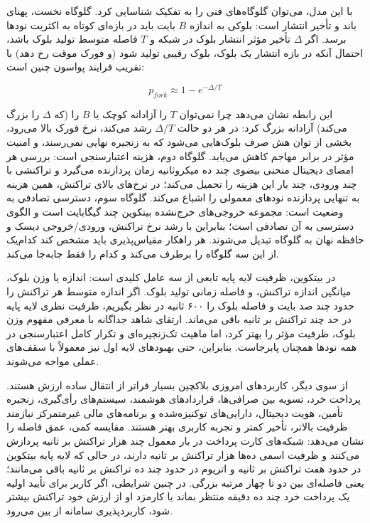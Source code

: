 با این مدل، می‌توان گلوگاه‌های فنی را به تفکیک شناسایی کرد. گلوگاه نخست، پهنای باند و تأخیر انتشار است: بلوکی به اندازه \(B\) بایت باید در بازه‌ای کوتاه به اکثریت نودها برسد. اگر \(\Delta\) تأخیر مؤثر انتشار بلوک در شبکه و \(T\) فاصله متوسط تولید بلوک باشد، احتمال آنکه در بازه انتشار یک بلوک، بلوک رقیبی تولید شود (و فورک موقت رخ دهد) با تقریب فرایند پواسون چنین است:

\begin{latin}
\[
p_{fork} \approx 1 - e^{-\Delta / T}
\]
\end{latin}

این رابطه نشان می‌دهد چرا نمی‌توان \(T\) را آزادانه کوچک یا \(B\) را (که \(\Delta\) را بزرگ می‌کند) آزادانه بزرگ کرد: در هر دو حالت \(\Delta/T\) رشد می‌کند، نرخ فورک بالا می‌رود، بخشی از توان هش صرف بلوک‌هایی می‌شود که به زنجیره نهایی نمی‌رسند، و امنیت مؤثر در برابر مهاجم کاهش می‌یابد. گلوگاه دوم، هزینه اعتبارسنجی است: بررسی هر امضای دیجیتال منحنی بیضوی چند ده میکروثانیه زمان پردازنده می‌گیرد و تراکنشی با چند ورودی، چند بار این هزینه را تحمیل می‌کند؛ در نرخ‌های بالای تراکنش، همین هزینه به تنهایی پردازنده نودهای معمولی را اشباع می‌کند. گلوگاه سوم، دسترسی تصادفی به وضعیت است: مجموعه خروجی‌های خرج‌نشده بیتکوین چند گیگابایت است و الگوی دسترسی به آن تصادفی است؛ بنابراین با رشد نرخ تراکنش، ورودی/خروجی دیسک و حافظه نهان به گلوگاه تبدیل می‌شوند. هر راهکار مقیاس‌پذیری باید مشخص کند کدام‌یک از این سه گلوگاه را برطرف می‌کند و کدام را فقط جابه‌جا می‌کند.

در بیتکوین، ظرفیت لایه پایه تابعی از سه عامل کلیدی است: اندازه یا وزن بلوک، میانگین اندازه تراکنش، و فاصله زمانی تولید بلوک. اگر اندازه متوسط هر تراکنش را حدود چند صد بایت و فاصله بلوک را ۶۰۰ ثانیه در نظر بگیریم، ظرفیت نظری لایه پایه در حد چند تراکنش بر ثانیه باقی می‌ماند. ارتقای شاهد جداگانه با معرفی مفهوم وزن بلوک، ظرفیت مؤثر را بهتر کرد، اما ماهیت تک‌زنجیره‌ای و تکرار کامل اعتبارسنجی در همه نودها همچنان پابرجاست. بنابراین، حتی بهبودهای لایه اول نیز معمولاً با سقف‌های عملی مواجه می‌شوند.

از سوی دیگر، کاربردهای امروزی بلاکچین بسیار فراتر از انتقال ساده ارزش هستند. پرداخت خرد، تسویه بین صرافی‌ها، قراردادهای هوشمند، سیستم‌های رأی‌گیری، زنجیره تأمین، هویت دیجیتال، دارایی‌های توکنیزه‌شده و برنامه‌های مالی غیرمتمرکز نیازمند ظرفیت بالاتر، تأخیر کمتر و تجربه کاربری بهتر هستند. مقایسه کمی، عمق فاصله را نشان می‌دهد: شبکه‌های کارت پرداخت در بار معمول چند هزار تراکنش بر ثانیه پردازش می‌کنند و ظرفیت اسمی ده‌ها هزار تراکنش بر ثانیه دارند، در حالی که لایه پایه بیتکوین در حدود هفت تراکنش بر ثانیه و اتریوم در حدود چند ده تراکنش بر ثانیه باقی می‌مانند؛ یعنی فاصله‌ای بین دو تا چهار مرتبه بزرگی. در چنین شرایطی، اگر کاربر برای تأیید اولیه یک پرداخت خرد چند ده دقیقه منتظر بماند یا کارمزد او از ارزش خود تراکنش بیشتر شود، کاربردپذیری سامانه از بین می‌رود.

